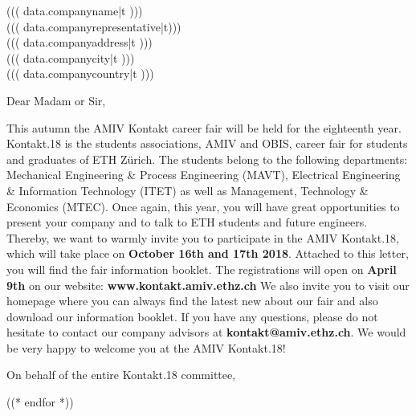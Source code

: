 \documentclass[kontakt]{amivletter}
\begin{document}
\begin{letter}{%
    ((( data.companyname|t )))\\
    ((( data.companyrepresentative|t)))\\
    ((( data.companyaddress|t )))\\
    ((( data.companycity|t )))\\
    ((( data.companycountry|t )))%
}

\opening{Dear Madam or Sir,}

This autumn the AMIV Kontakt career fair will be held for the eighteenth year.
Kontakt.18 is the students associations, AMIV and OBIS, career fair for students and graduates of ETH Zürich.
The students belong to the following departments:
Mechanical Engineering \& Process Engineering (MAVT), Electrical Engineering \& Information Technology (ITET) as well as
Management, Technology \& Economics (MTEC).
Once again, this year, you will have great opportunities to present your company and to talk to ETH students and future engineers.
\medbreak
Thereby, we want to warmly invite you to participate in the AMIV Kontakt.18,
which will take place on \textbf{October 16th and 17th 2018}.
Attached to this letter, you will find the fair information booklet.
\medbreak
\noindent The registrations will open on \textbf{April 9th} on our website: \textbf{www.kontakt.amiv.ethz.ch}
\medbreak
We also invite you to visit our homepage where you can always find the latest new about our fair and also download our information booklet. 
\medbreak\noindent
If you have any questions, please do not hesitate to contact our company advisors at \textbf{kontakt@amiv.ethz.ch}.
We would be very happy to welcome you at the AMIV Kontakt.18!

\closing{On behalf of the entire Kontakt.18 committee,}


\end{letter}



((* endfor *))
\end{document}
